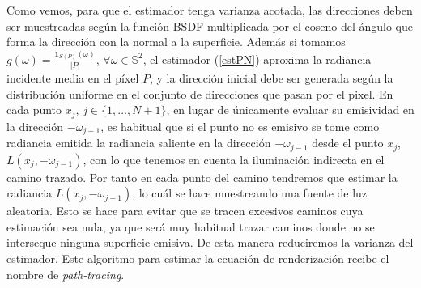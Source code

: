 Como vemos, para que el estimador tenga varianza acotada, las direcciones deben ser muestreadas según la función BSDF multiplicada por el coseno del ángulo que forma la dirección con la normal a la superficie. Además si tomamos $g(\omega) = \frac{\mathds{1}_{S(P)}(\omega)}{|P|}$, $\forall \omega\in\mathds{S}^2$, el estimador (\ref{estPN}) aproxima la radiancia incidente media en el píxel $P$, y la dirección inicial debe ser generada según la distribución uniforme en el conjunto de direcciones que pasan por el pixel. En cada punto $x_j$, $j\in\{1,\ldots,N+1\}$, en lugar de únicamente evaluar su emisividad en la dirección $-\omega_{j-1}$, es habitual que si el punto no es emisivo se tome como radiancia emitida la radiancia saliente en la dirección $-\omega_{j-1}$ desde el punto $x_j$, $L(x_j,-\omega_{j-1})$, con lo que tenemos en cuenta la iluminación indirecta en el camino trazado. Por tanto en cada punto del camino tendremos que estimar la radiancia $L(x_j,-\omega_{j-1})$, lo cuál se hace muestreando una fuente de luz aleatoria. Esto se hace para evitar que se tracen excesivos caminos cuya estimación sea nula, ya que será muy habitual trazar caminos donde no se interseque ninguna superficie emisiva. De esta manera reduciremos la varianza del estimador. Este algoritmo para estimar la ecuación de renderización recibe el nombre de \emph{path-tracing}.
